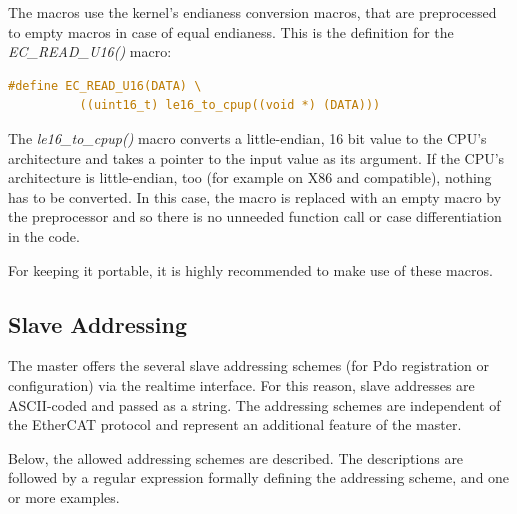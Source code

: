 \documentclass[a4paper,12pt,BCOR6mm,bibtotoc,idxtotoc]{scrbook}
\begin{document}
The macros use the kernel's endianess conversion macros, that are
preprocessed to empty macros in case of equal endianess. This is the
definition for the \textit{EC\_\-READ\_\-U16()} macro:

\begin{lstlisting}[gobble=2,language=C]
  #define EC_READ_U16(DATA) \
          ((uint16_t) le16_to_cpup((void *) (DATA)))
\end{lstlisting}

The \textit{le16\_to\_cpup()} macro converts a little-endian, 16 bit
value to the CPU's architecture and takes a pointer to the input value
as its argument. If the CPU's architecture is little-endian, too (for
example on X86 and compatible), nothing has to be converted. In this
case, the macro is replaced with an empty macro by the preprocessor
and so there is no unneeded function call or case differentiation in
the code.

For keeping it portable, it is highly recommended to make use of these
macros.


\subsection{Slave Addressing}
\label{sec:addr}

The master offers the several slave addressing schemes (for Pdo
registration or configuration) via the realtime interface. For this
reason, slave addresses are ASCII-coded and passed as a
string. The addressing schemes are independent of the EtherCAT
protocol and represent an additional feature of the master.

Below, the allowed addressing schemes are described. The descriptions
are followed by a regular expression formally defining the addressing
scheme, and one or more examples.
\end{document}
